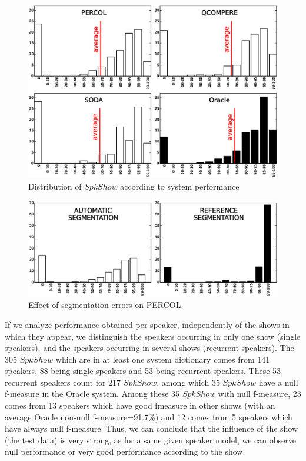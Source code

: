 \begin{figure}[t]
\centering
\includegraphics[width=\linewidth]{figures/bimodal.eps}
\caption{Distribution of $SpkShow$ according to system performance}
\label{fig:FMeasureDistribution}
\end{figure}


\begin{figure}[t]
\centering
\includegraphics[width=\linewidth]{figures/ref.eps}
\caption{Effect of segmentation errors on PERCOL.}
\label{fig:autoVSref}
\end{figure}

If we analyze performance obtained per speaker, independently of the shows in which they appear, we distinguish the speakers occurring in only one show (single speakers), and the speakers occurring in several shows (recurrent speakers). The 305 $SpkShow$ which are in at least one system dictionary comes from 141 speakers, 88 being single speakers and 53 being recurrent speakers. These 53 recurrent speakers count for 217 $SpkShow$, among which 35 $SpkShow$ have a null f-measure in the Oracle system. Among these 35 $SpkShow$ with null f-measure, 23 comes from 13 speakers which have good fmeasure in other shows (with an average Oracle non-null f-measure=91.7\%) and 12 comes from 5 speakers which have always null f-measure. Thus, we can conclude that the influence of the show (the test data) is very strong, as for a same given speaker model, we can observe null performance or very good performance according to the show.
 
